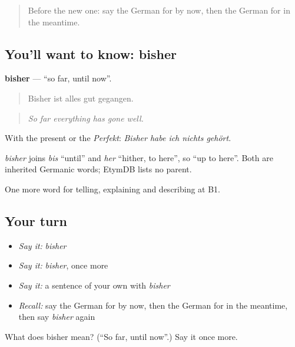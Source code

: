 \begin{quote}
Before the new one: say the German for by now, then the German for in the meantime.
\end{quote}

\subsection*{You'll want to know: bisher}
\textbf{bisher} — \textquotedblleft{}so far, until now\textquotedblright{}.

\begin{quote}
Bisher ist alles gut gegangen.
\end{quote}

\begin{quote}
\emph{So far everything has gone well.}
\end{quote}

With the present or the \emph{Perfekt}: \emph{Bisher habe ich nichts gehört}.

\begin{cousinweb}
\emph{bisher} joins \emph{bis} \textquotedblleft{}until\textquotedblright{} and \emph{her} \textquotedblleft{}hither, to here\textquotedblright{}, so \textquotedblleft{}up to here\textquotedblright{}. Both are inherited Germanic words; EtymDB lists no parent.
\end{cousinweb}

\begin{grammarlens}[title={What you've built}]
One more word for telling, explaining and describing at B1.
\end{grammarlens}

\subsection*{Your turn}
\begin{itemize}
\raggedright
  \item \emph{Say it:} \emph{bisher}
  \item \emph{Say it:} \emph{bisher}, once more
  \item \emph{Say it:} a sentence of your own with \emph{bisher}
  \item \emph{Recall:} say the German for by now, then the German for in the meantime, then say \emph{bisher} again
\end{itemize}

\begin{tcolorbox}[breakable,colback=teal!4,colframe=teal!35!black,title={Before you move on}]
What does bisher mean? (\textquotedblleft{}So far, until now\textquotedblright{}.) Say it once more.
\end{tcolorbox}

